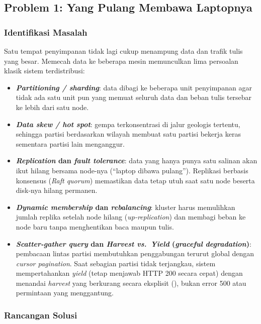 \subsection{Problem 1: Yang Pulang Membawa Laptopnya}

\subsubsection{Identifikasi Masalah}

Satu tempat penyimpanan tidak lagi cukup menampung data dan trafik tulis yang besar. Memecah data ke beberapa mesin memunculkan lima persoalan klasik sistem terdistribusi:
\begin{itemize}
\item \textbf{\textit{Partitioning / sharding}}: data dibagi ke beberapa unit penyimpanan agar tidak ada satu unit pun yang memuat seluruh data dan beban tulis tersebar ke lebih dari satu node.
\item \textbf{\textit{Data skew / hot spot}}: gempa terkonsentrasi di jalur geologis tertentu, sehingga partisi berdasarkan wilayah membuat satu partisi bekerja keras sementara partisi lain menganggur.
\item \textbf{\textit{Replication} dan \textit{fault tolerance}}: data yang hanya punya satu salinan akan ikut hilang bersama node-nya (``laptop dibawa pulang''). Replikasi berbasis konsensus (\textit{Raft quorum}) memastikan data tetap utuh saat satu node beserta disk-nya hilang permanen.
\item \textbf{\textit{Dynamic membership} dan \textit{rebalancing}}: kluster harus memulihkan jumlah replika setelah node hilang (\textit{up-replication}) dan membagi beban ke node baru tanpa menghentikan baca maupun tulis.
\item \textbf{\textit{Scatter-gather query} dan \textit{Harvest vs.\ Yield} (\textit{graceful degradation})}: pembacaan lintas partisi membutuhkan penggabungan terurut global dengan \textit{cursor pagination}. Saat sebagian partisi tidak terjangkau, sistem mempertahankan \textit{yield} (tetap menjawab HTTP 200 secara cepat) dengan menandai \textit{harvest} yang berkurang secara eksplisit (), bukan error 500 atau permintaan yang menggantung.
\end{itemize}

\subsubsection{Rancangan Solusi}


